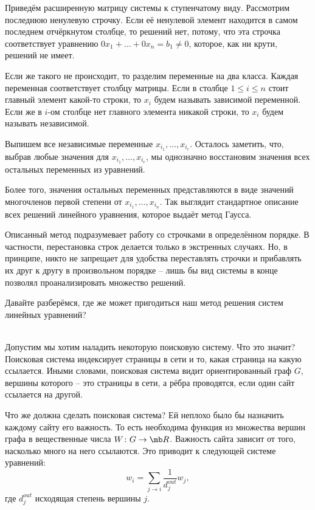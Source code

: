 Приведём расширенную матрицу системы к ступенчатому виду. Рассмотрим последнюю ненулевую строчку. Если её ненулевой элемент находится в самом последнем отчёркнутом столбце, то решений нет, потому, что эта строчка соответствует уравнению $0x_1+\dots+0x_n=b_1\neq 0$, которое, как ни крути, решений не имеет.

Если же такого не происходит, то разделим переменные на два класса. Каждая переменная соответствует столбцу матрицы. Если в  столбце $1\leq i\leq n$ стоит главный элемент какой-то строки, то $x_i$ будем называть зависимой переменной. Если же в $i$-ом столбце нет главного элемента никакой строки, то $x_i$ будем называть независимой.

Выпишем все независимые переменные $x_{i_1},\dots,x_{i_r}$. Осталось заметить, что, выбрав любые значения для $x_{i_1},\dots,x_{i_r}$,  мы однозначно восстановим значения всех остальных переменных из уравнений.

Более того, значения остальных переменных представляются в виде значений многочленов первой степени от  $x_{i_1},\dots,x_{i_n}$. Так выглядит стандартное описание всех решений линейного уравнения, которое выдаёт метод Гаусса.

\rm Описанный метод подразумевает работу со строчками в определённом порядке. В частности, перестановка строк делается только в экстренных случаях. Но, в принципе, никто не запрещает для удобства переставлять строчки и прибавлять их друг к другу в произвольном порядке -- лишь бы вид системы в конце позволял проанализировать множество решений.
\erm

Давайте разберёмся, где же может пригодиться наш метод решения систем линейных уравнений?

\exm\\
Допустим мы хотим наладить некоторую поисковую систему. Что это значит? Поисковая система индексирует страницы в сети и то, какая страница на какую ссылается. Иными словами, поисковая система видит ориентированный граф $G$, вершины которого -- это страницы в сети, а рёбра проводятся, если один сайт ссылается на другой.

Что же должна сделать поисковая система? Ей неплохо было бы назначить каждому сайту его важность. То есть необходима функция из множества вершин графа в вещественные числа  $W\colon G \to \mb R$. Важность сайта зависит от того, насколько много на него ссылаются. Это приводит  к следующей системе уравнений:
$$w_i=\sum_{j\to i} \frac{1}{d_j^{out}}w_j,$$
где $d_j^{out}$ исходящая степень вершины $j$. 




